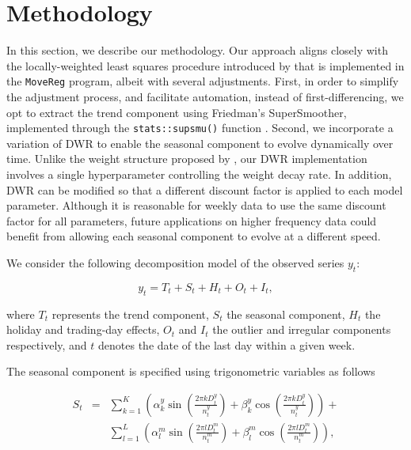 \hypertarget{methodology}{%
\section{Methodology}\label{methodology}}

In this section, we describe our methodology. Our approach aligns closely with the locally-weighted least squares procedure introduced by \citet{cleveland2014} that is implemented in the \texttt{MoveReg} program, albeit with several adjustments. First, in order to simplify the adjustment process, and facilitate automation, instead of first-differencing, we opt to extract the trend component using Friedman's SuperSmoother, implemented through the \texttt{stats::supsmu()} function \citep{stats}. Second, we incorporate a variation of DWR to enable the seasonal component to evolve dynamically over time. Unlike the weight structure proposed by \citet{cleveland2014}, our DWR implementation involves a single hyperparameter controlling the weight decay rate. In addition, DWR can be modified so that a different discount factor is applied to each model parameter. Although it is reasonable for weekly data to use the same discount factor for all parameters, future applications on higher frequency data could benefit from allowing each seasonal component to evolve at a different speed.

We consider the following decomposition model of the observed series \(y_{t}\):

\begin{equation}
    y_{t}=T_{t}+S_{t}+H_{t}+O_{t}+I_{t},
     \label{eq:eq1}
\end{equation}

where \(T_{t}\) represents the trend component, \(S_{t}\) the seasonal component, \(H_{t}\) the holiday and trading-day effects, \(O_{t}\) and \(I_{t}\) the outlier and irregular components respectively, and \(t\) denotes the date of the last day within a given week.

The seasonal component is specified using trigonometric variables as follows

\begin{eqnarray}
S_{t} &=&\sum_{k=1}^{K}\left( \alpha _{k}^{y}\sin (\frac{2\pi kD_{t}^{y}}{
n_{t}^{y}})+\beta _{k}^{y}\cos (\frac{2\pi kD_{t}^{y}}{n_{t}^{y}})\right) + \nonumber
\\
&&\sum_{l=1}^{L}\left( \alpha _{l}^{m}\sin (\frac{2\pi lD_{t}^{m}}{n_{t}^{m}}
)+\beta _{l}^{m}\cos (\frac{2\pi lD_{t}^{m}}{n_{t}^{m}})\right) ,
\label{eq:seqscomp}
\end{eqnarray}

